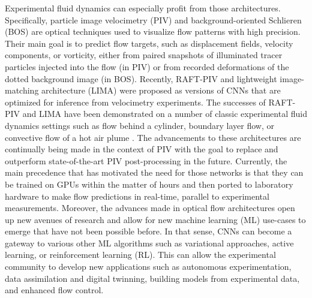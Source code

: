 \documentclass[a4paper,fleqn]{cas-dc}
\begin{document}
Experimental fluid dynamics can especially profit from those architectures. Specifically, particle image velocimetry (PIV) and background-oriented Schlieren (BOS) are optical techniques used to visualize flow patterns with high precision. Their main goal is to predict flow targets, such as displacement fields, velocity components, or vorticity, either from paired snapshots of illuminated tracer particles injected into the flow (in PIV) or from recorded deformations of the dotted background image (in BOS). Recently, RAFT-PIV \cite{lagemann2021deep} and lightweight image-matching architecture (LIMA) \citep{manickathan2023lightweight} were proposed as versions of CNNs that are optimized for inference from velocimetry experiments. The successes of RAFT-PIV and LIMA have been demonstrated on a number of classic experimental fluid dynamics settings such as flow behind a cylinder, boundary layer flow, or convective flow of a hot air plume \cite{mucignat2023lightweight}. The advancements to these architectures are continually being made in the context of PIV \citep{yu2021lightpivnet, fan2023deep, choi2023deep, shan2024lightweight, elrefaie2024site} with the goal to replace and outperform state-of-the-art PIV post-processing in the future. Currently, the main precedence that has motivated the need for those networks is that they can be trained on GPUs within the matter of hours and then ported to laboratory hardware to make flow predictions in real-time, parallel to experimental measurements.
Moreover, the advances made in optical flow architectures open up new avenues of research and allow for new machine learning (ML) use-cases to emerge that have not been possible before. In that sense, CNNs can become a gateway to various other ML algorithms such as variational approaches, active learning, or reinforcement learning (RL). This can allow the experimental community to develop new applications such as autonomous experimentation, data assimilation and digital twinning, building models from experimental data, and enhanced flow control.
\end{document}
